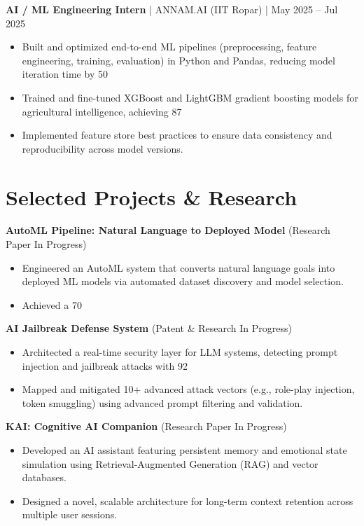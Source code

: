 \documentclass[10pt, letterpaper]{article}
\begin{document}
\textbf{AI / ML Engineering Intern} | ANNAM.AI (IIT Ropar) | May 2025 – Jul 2025
\begin{itemize}[leftmargin=*, itemsep=2pt]
    \item Built and optimized end-to-end ML pipelines (preprocessing, feature engineering, training, evaluation) in Python and Pandas, reducing model iteration time by 50%
    \item Trained and fine-tuned XGBoost and LightGBM gradient boosting models for agricultural intelligence, achieving 87%
    \item Implemented feature store best practices to ensure data consistency and reproducibility across model versions.
\end{itemize}

\section{Selected Projects & Research}

\textbf{AutoML Pipeline: Natural Language to Deployed Model} (Research Paper In Progress)
\begin{itemize}[leftmargin=*, itemsep=2pt]
    \item Engineered an AutoML system that converts natural language goals into deployed ML models via automated dataset discovery and model selection.
    \item Achieved a 70%
\end{itemize}

\textbf{AI Jailbreak Defense System} (Patent & Research In Progress)
\begin{itemize}[leftmargin=*, itemsep=2pt]
    \item Architected a real-time security layer for LLM systems, detecting prompt injection and jailbreak attacks with 92%
    \item Mapped and mitigated 10+ advanced attack vectors (e.g., role-play injection, token smuggling) using advanced prompt filtering and validation.
\end{itemize}

\textbf{KAI: Cognitive AI Companion} (Research Paper In Progress)
\begin{itemize}[leftmargin=*, itemsep=2pt]
    \item Developed an AI assistant featuring persistent memory and emotional state simulation using Retrieval-Augmented Generation (RAG) and vector databases.
    \item Designed a novel, scalable architecture for long-term context retention across multiple user sessions.
\end{itemize}
\end{document}
